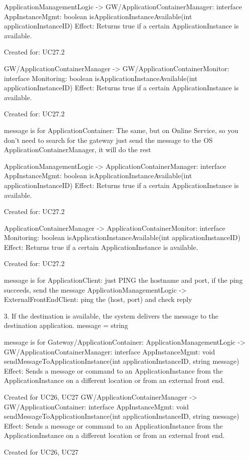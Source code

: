                     ApplicationManagementLogic -> GW/ApplicationContainerManager: interface AppInstanceMgmt: boolean isApplicationInstanceAvailable(int applicationInstanceID)
                        Effect: Returns true if a certain ApplicationInstance is available.
                        \item Created for: UC27.2

                    GW/ApplicationContainerManager -> GW/ApplicationContainerMonitor: interface Monitoring: boolean isApplicationInstanceAvailable(int applicationInstanceID)
                        Effect: Returns true if a certain ApplicationInstance is available.
                        \item Created for: UC27.2


                message is for ApplicationContainer:
                    The same, but on Online Service, so you don't need to search for the gateway
                    just send the message to the OS ApplicationContainerManager, it will do the rest

                    ApplicationManagementLogic -> ApplicationContainerManager: interface AppInstanceMgmt: boolean isApplicationInstanceAvailable(int applicationInstanceID)
                        Effect: Returns true if a certain ApplicationInstance is available.
                        \item Created for: UC27.2

                    ApplicationContainerManager -> ApplicationContainerMonitor: interface Monitoring: boolean isApplicationInstanceAvailable(int applicationInstanceID)
                        Effect: Returns true if a certain ApplicationInstance is available.
                        \item Created for: UC27.2


                message is for ApplicationClient:
                    just PING the hostname and port, if the ping succeeds, send the message
                        ApplicationManagementLogic -> ExternalFrontEndClient: ping the (host, port) and check reply

            3. If the destination is available, the system delivers the message to the destination application.
                message = string

                message is for Gateway/ApplicationContainer:
                    ApplicationManagementLogic -> GW/ApplicationContainerManager: interface AppInstanceMgmt: void sendMessageToApplicationInstance(int applicationInstanceID, string message)
                        Effect: Sends a message or command to an ApplicationInstance from the ApplicationInstance on a different location or from an external front end.
                        \item Created for UC26, UC27
                    GW/ApplicationContainerManager -> GW/ApplicationContainer: interface AppInstanceMgmt: void sendMessageToApplicationInstance(int applicationInstanceID, string message)
                        Effect: Sends a message or command to an ApplicationInstance from the ApplicationInstance on a different location or from an external front end.
                        \item Created for UC26, UC27

